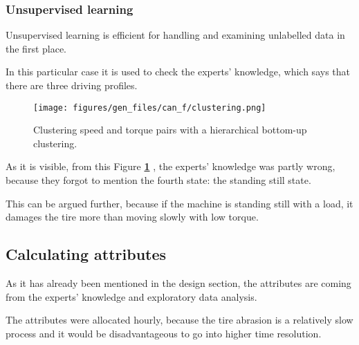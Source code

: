 	\subsubsection{Unsupervised learning}
	Unsupervised learning is efficient for handling and examining unlabelled data in the first place.
	
	In this particular case it is used to check the experts' knowledge, which says that there are three driving profiles.
	\begin{figure}[H]
			\centering
			\texttt{[image: figures/gen\_files/can\_f/clustering.png]}
			\caption{Clustering speed and torque pairs with a hierarchical bottom-up clustering.\label{fig:clustering}} 
	\end{figure}
	As it is visible, from this Figure \textbf{\ref{fig:clustering}} , the experts' knowledge was partly wrong, because they forgot to mention the fourth state: the standing still state.

	This can be argued further, because if the machine is standing still with a load, it damages the tire more than moving slowly with low torque.
\newpage
\subsection{Calculating attributes}
As it has already been mentioned in the design section, the attributes are coming from the experts' knowledge and exploratory data analysis.

The attributes were allocated hourly, because the tire abrasion is a relatively slow process and it would be disadvantageous to go into higher time resolution.

